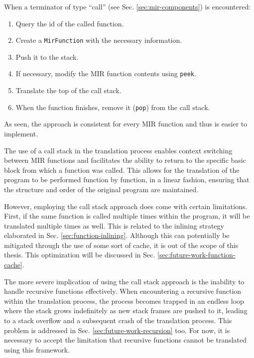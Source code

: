 When a terminator of type ``call'' (see Sec. \ref{sec:mir-components}) is encountered:

\begin{enumerate}
    \item Query the id of the called function.
    \item Create a \texttt{MirFunction} with the necessary information.
    \item Push it to the stack.
    \item If necessary, modify the \acrshort{MIR} function contents using \texttt{peek}.
    \item Translate the top of the call stack.
    \item When the function finishes, remove it (\texttt{pop}) from the call stack.
\end{enumerate}

As seen, the approach is consistent for every \acrshort{MIR} function
and thus is easier to implement.

The use of a call stack in the translation process enables context switching
between \acrshort{MIR} functions and facilitates the ability to return to the specific basic block
from which a function was called.
This allows for the translation of the program to be performed function by function,
in a linear fashion, ensuring that the structure and order of the original program are maintained.

However, employing the call stack approach does come with certain limitations.
First, if the same function is called multiple times within the program,
it will be translated multiple times as well.
This is related to the inlining strategy elaborated in Sec. \ref{sec:function-inlining}.
Although this can potentially be mitigated through the use of some sort of cache,
it is out of the scope of this thesis.
This optimization will be discussed in Sec. \ref{sec:future-work-function-cache}.

The more severe implication of using the call stack approach
is the inability to handle recursive functions effectively.
When encountering a recursive function within the translation process,
the process becomes trapped in an endless loop
where the stack grows indefinitely as new stack frames are pushed to it,
leading to a stack overflow and a subsequent crash of the translation process.
This problem is addressed in Sec. \ref{sec:future-work-recursion} too.
For now, it is necessary to accept the limitation that recursive functions
cannot be translated using this framework.
